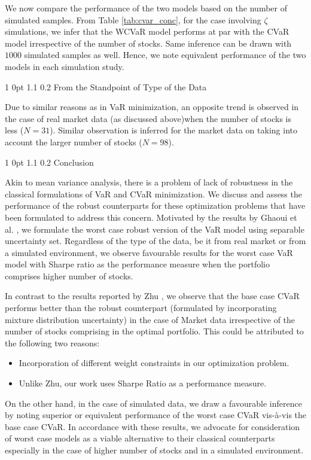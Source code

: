 \documentclass[12pt]{article}
\makeatletter
\numberwithin{equation}{section}
\renewcommand{\section}{
  \@startsection
  {section}%
  {1}%
  {0pt}%
  {1.1\baselineskip}%
  {0.2\baselineskip}%
  {\sc \centering}%
}
\renewcommand{\subsubsection}{
  \@startsection
  {subsubsection}%
  {1}%
  {0pt}%
  {1.1\baselineskip}%
  {0.2\baselineskip}%
  {\sc \centering}%
}
\makeatother
\begin{document}
We now compare the performance of the two models based on the number of simulated samples. From Table \ref{tab:cvar_conc}, for the case involving $\zeta$ simulations, we infer that the WCVaR model performs at par with the CVaR model irrespective of the number of stocks. Same inference can be drawn with $1000$ simulated samples as well. Hence, we note equivalent performance of the two models in each simulation study.

\subsubsection{From the Standpoint of Type of the Data}

Due to similar reasons as in VaR minimization, an opposite trend is observed in the case of real market data (as discussed above)when the number of stocks is less ($N=31$). Similar observation is inferred for the market data on taking into account the larger number of stocks ($N=98$). 

\section{Conclusion}
\label{Conclusion}

Akin to mean variance analysis, there is a problem of lack of robustness in the classical formulations of VaR and CVaR minimization. We discuss and assess the performance of the robust counterparts for these optimization problems that have been formulated to address this concern. Motivated by the results by Ghaoui et al. \cite{ghaoui03}, we formulate the worst case robust version of the VaR model using separable uncertainty set. Regardless of the type of the data, be it from real market or from a simulated environment, we observe favourable results for the worst case VaR model with Sharpe ratio as the performance measure when the portfolio comprises higher number of stocks. 

In contrast to the results reported by Zhu \cite{zhu}, we observe that the base case CVaR performs better than the robust counterpart (formulated by incorporating mixture distribution uncertainty) in the case of Market data irrespective of the number of stocks comprising in the optimal portfolio. This could be attributed to the following two reasons:
\begin{itemize}
    \item Incorporation of different weight constraints in our optimization problem.
    \item Unlike Zhu, our work uses Sharpe Ratio as a performance measure.
\end{itemize}
On the other hand, in the case of simulated data, we draw a favourable inference by noting superior or equivalent performance of the worst case CVaR vis-\`a-vis the base case CVaR. In accordance with these results, we advocate for consideration of worst case models as a viable alternative to their classical counterparts especially in the case of higher number of stocks and in a simulated environment.
\end{document}
